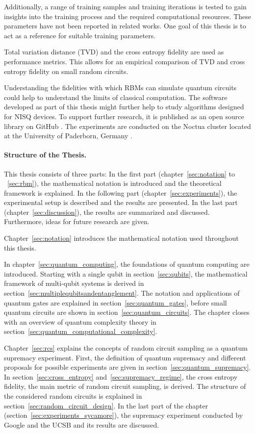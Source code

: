 Additionally, a range of training samples and training iterations 
is tested to gain insights into the training process and the required computational resources. 
These parameters have not been reported in related works. One goal of this thesis is 
to act as a reference for suitable training parameters. 

Total variation distance (TVD) and the cross entropy fidelity are used as 
performance metrics. This allows for an empirical comparison of TVD and cross entropy fidelity 
on small random circuits.

Understanding the
fidelities with which RBMs can simulate quantum circuits could help to understand
the limits of classical computation. The software developed as part of this thesis 
might further help to study algorithms designed for NISQ devices. To support 
further research, it is published as 
an open source library on GitHub \cite{NQS2020}.
The experiments are conducted on the Noctua cluster located at the 
University of Paderborn, Germany \cite{noctua2020}.

\paragraph{Structure of the Thesis.}
This thesis consists of three parts: 
In the first part (chapter~\ref{sec:notation} to ~\ref{sec:rbm}), the mathematical 
notation is introduced and the theoretical framework is explained. In the 
following part (chapter~\ref{sec:experiments}), 
the experimental setup is described and the results are presented. 
In the last part (chapter~\ref{sec:discussion}), the results are summarized and discussed.
Furthermore, ideas for future research are given.

Chapter~\ref{sec:notation} introduces the mathematical notation used throughout this 
thesis.

In chapter~\ref{sec:quantum_computing}, the foundations of quantum computing are introduced. 
Starting with a single qubit in section~\ref{sec:qubits}, the mathematical framework of multi-qubit systems is derived
in section~\ref{sec:multiplequbitsandentanglement}. The notation and applications 
of quantum gates are explained in section~\ref{sec:quantum_gates}, before small quantum circuits are shown
in section~\ref{sec:quantum_circuits}. The chapter closes with an overview of quantum complexity 
theory in section~\ref{sec:quantum_computational_complexity}.

Chapter~\ref{sec:rcs} explains the concepts of random circuit sampling as a quantum supremacy experiment.
First, the definition of quantum supremacy and different proposals for possible experiments 
are given in section~\ref{sec:quantum_supremacy}. 
In section~\ref{sec:cross_entropy} and~\ref{sec:supremacy_regime}, the 
cross entropy fidelity, the main metric of random circuit sampling, is derived.
The structure of the considered random circuits is explained in section~\ref{sec:random_circuit_design}.
In the last part of the chapter (section~\ref{sec:experiments_sycamore}), the supremacy experiment conducted by Google and the UCSB 
and its results are discussed.

